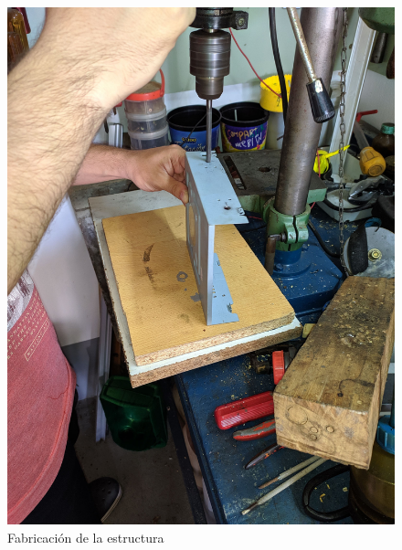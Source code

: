 \begin{figure}[H]
\centering
\includegraphics[width=0.9\linewidth]{imagenes/carcasa1.jpg}
\caption{Fabricación de la estructura}
\label{fig:agujero-caja}
\end{figure}

